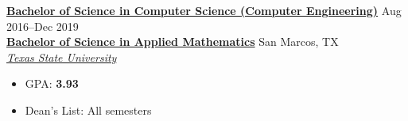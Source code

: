 \documentclass[10pt]{article}
\newcommand{\dressubheading}[5]{
    \textbf{#1} \hfill #2 \\[0pt]
    \textbf{#3} \hfill #4 \\[0pt]
    \textit{#5} \\[0pt]
}
\newenvironment{resitemize}{
    \vspace{-6pt}
    \begin{itemize}
    \setlength\itemsep{-2pt}
}{
    \end{itemize}
}
\begin{document}
\begin{NoHyper}
\dressubheading
	{\href{http://mycatalog.txstate.edu/undergraduate/science-engineering/computer/computer-science-concentration-engineering-bs/}{Bachelor of Science in Computer Science (Computer Engineering)}}
    {Aug 2016--Dec 2019}
	{\href{http://mycatalog.txstate.edu/undergraduate/science-engineering/mathematics/applied-bs/}{Bachelor of Science in Applied Mathematics}}
    {San Marcos, TX}
    {\href{http://www.txstate.edu/}{Texas State University}}
    \begin{resitemize}
        \item GPA: \textbf{3.93}
        \item Dean's List: All semesters

\end{resitemize}
\end{NoHyper}
\end{document}
